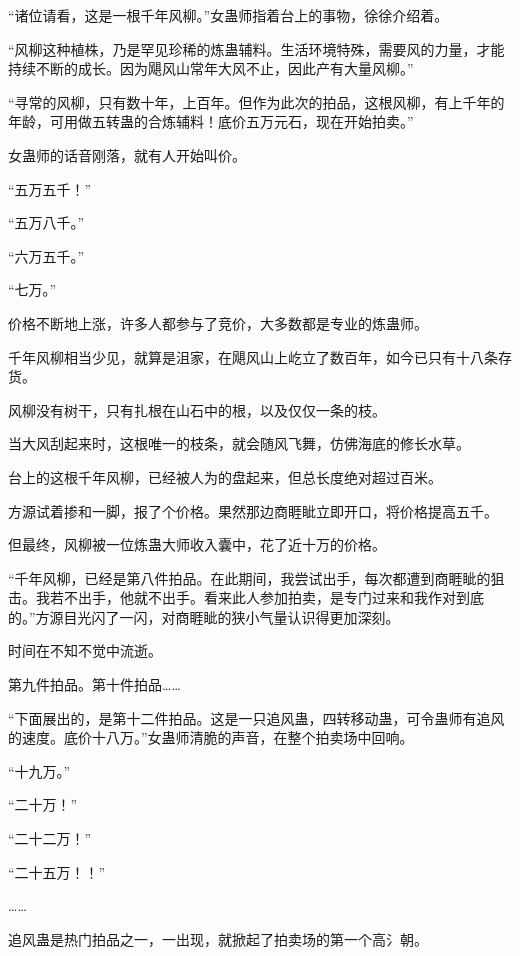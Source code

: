 
\begin{this_body}

“诸位请看，这是一根千年风柳。”女蛊师指着台上的事物，徐徐介绍着。

“风柳这种植株，乃是罕见珍稀的炼蛊辅料。生活环境特殊，需要风的力量，才能持续不断的成长。因为飓风山常年大风不止，因此产有大量风柳。”

“寻常的风柳，只有数十年，上百年。但作为此次的拍品，这根风柳，有上千年的年龄，可用做五转蛊的合炼辅料！底价五万元石，现在开始拍卖。”

女蛊师的话音刚落，就有人开始叫价。

“五万五千！”

“五万八千。”

“六万五千。”

“七万。”

价格不断地上涨，许多人都参与了竞价，大多数都是专业的炼蛊师。

千年风柳相当少见，就算是沮家，在飓风山上屹立了数百年，如今已只有十八条存货。

风柳没有树干，只有扎根在山石中的根，以及仅仅一条的枝。

当大风刮起来时，这根唯一的枝条，就会随风飞舞，仿佛海底的修长水草。

台上的这根千年风柳，已经被人为的盘起来，但总长度绝对超过百米。

方源试着掺和一脚，报了个价格。果然那边商睚眦立即开口，将价格提高五千。

但最终，风柳被一位炼蛊大师收入囊中，花了近十万的价格。

“千年风柳，已经是第八件拍品。在此期间，我尝试出手，每次都遭到商睚眦的狙击。我若不出手，他就不出手。看来此人参加拍卖，是专门过来和我作对到底的。”方源目光闪了一闪，对商睚眦的狭小气量认识得更加深刻。

时间在不知不觉中流逝。

第九件拍品。第十件拍品……

“下面展出的，是第十二件拍品。这是一只追风蛊，四转移动蛊，可令蛊师有追风的速度。底价十八万。”女蛊师清脆的声音，在整个拍卖场中回响。

“十九万。”

“二十万！”

“二十二万！”

“二十五万！！”

……

追风蛊是热门拍品之一，一出现，就掀起了拍卖场的第一个高氵朝。


\end{this_body}

